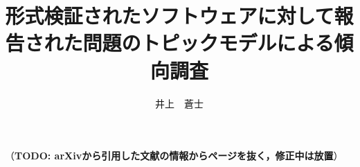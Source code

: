 \documentclass[a4j,12pt,twoside]{jreport}
\author{井上　蒼士}
\title{形式検証されたソフトウェアに対して報告された\coverbreak 問題の\abstbreak トピックモデルによる傾向調査}
\newcommand{\todo}[1]{
	{
		\color{red}
		（\textbf{TODO: #1}）
	}
}
\begin{document}
\maketitle



\begin{contents}
	\tableofcontents
\end{contents}














\todo{arXivから引用した文献の情報からページを抜く，修正中は放置}

% 
\end{document}
